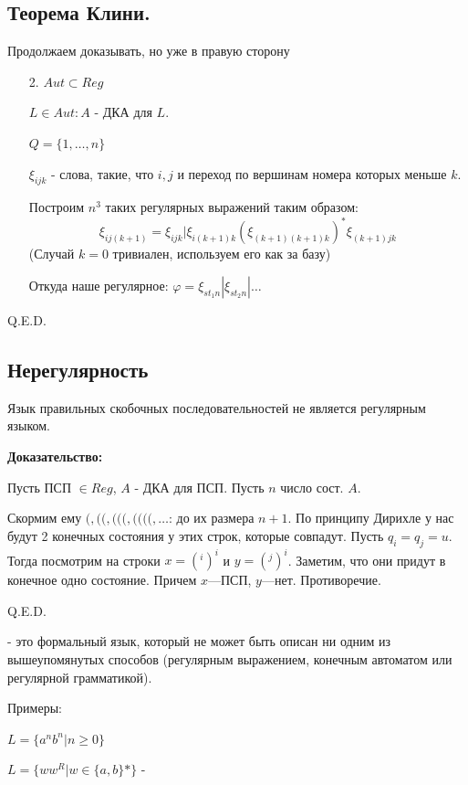 \subsection{Теорема Клини.}

Продолжаем доказывать, но уже в правую сторону

\begin{enumerate}
    \item[2.] $Aut \subset Reg$

    $L \in Aut: A$ - ДКА для $L$.

    $Q = \{1,\ldots, n\}$

    $\xi_{ijk}$ - слова, такие, что $i,j$ и переход по вершинам номера которых меньше $k$.

    Построим $n^3$ таких регулярных выражений таким образом:
    $$\xi_{ij (k+1)} = \xi_{ijk} | \xi_{i(k+1)k}(\xi_{(k+1) (k+1) k})^* \xi_{(k+1)jk}$$
    (Случай $k=0$ тривиален, используем его как за базу)
    
    Откуда наше регулярное: $\varphi = \xi_{s t_1n}|\xi_{st_2n}|\ldots$
    
\end{enumerate}

\hfill Q.E.D.

\subsection{Нерегулярность}

Язык правильных скобочных последовательностей не является регулярным языком.

\textbf{Доказательство:}

Пусть ПСП $\in Reg$, $A$ - ДКА для ПСП. Пусть $n$ число сост. $A$.

Скормим ему $(,((,(((,((((,\ldots$: до их размера $n+1$. По принципу Дирихле у нас будут 2 конечных состояния у этих строк, которые совпадут. Пусть $q_i = q_j  = u$. Тогда посмотрим на строки $x= (^i)^i$ и $y = (^j)^i$. Заметим, что они придут в конечное одно состояние. Причем $x$---ПСП, $y$---нет. Противоречие.

\hfill Q.E.D.

 - это формальный язык, который не может быть описан ни одним из вышеупомянутых способов (регулярным выражением, конечным автоматом или регулярной грамматикой).

Примеры:

$L = \{a^n b^n | n \geq 0\}$

$L = \{w w^R | w \in \{a, b\}* \}$ - 

